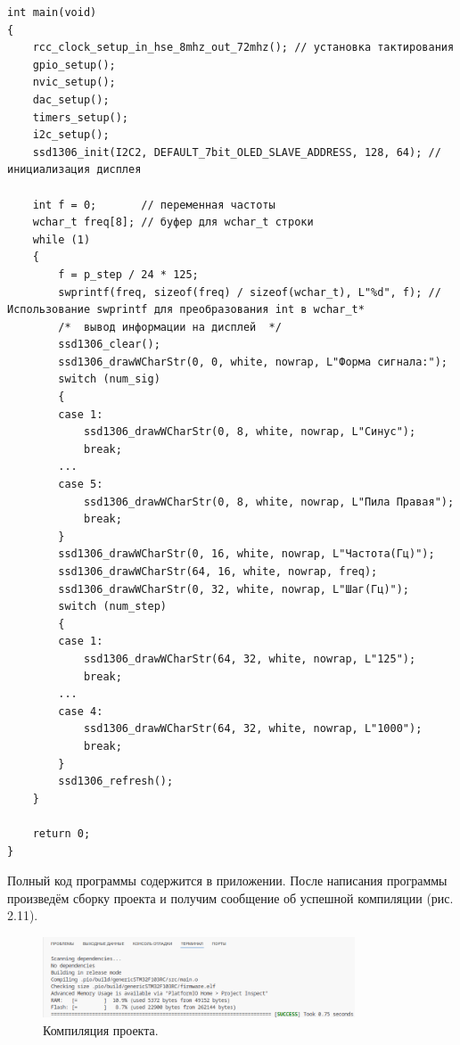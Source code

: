 \begin{code}
\begin{verbatim}
int main(void)
{
    rcc_clock_setup_in_hse_8mhz_out_72mhz(); // установка тактирования
    gpio_setup();
    nvic_setup();
    dac_setup();
    timers_setup();
    i2c_setup();
    ssd1306_init(I2C2, DEFAULT_7bit_OLED_SLAVE_ADDRESS, 128, 64); // инициализация дисплея

    int f = 0;       // переменная частоты
    wchar_t freq[8]; // буфер для wchar_t строки
    while (1)
    {
        f = p_step / 24 * 125;
        swprintf(freq, sizeof(freq) / sizeof(wchar_t), L"%d", f); // Использование swprintf для преобразования int в wchar_t*
        /*  вывод информации на дисплей  */
        ssd1306_clear();
        ssd1306_drawWCharStr(0, 0, white, nowrap, L"Форма сигнала:");
        switch (num_sig)
        {
        case 1:
            ssd1306_drawWCharStr(0, 8, white, nowrap, L"Синус");
            break;
        ...
        case 5:
            ssd1306_drawWCharStr(0, 8, white, nowrap, L"Пила Правая");
            break;
        }
        ssd1306_drawWCharStr(0, 16, white, nowrap, L"Частота(Гц)");
        ssd1306_drawWCharStr(64, 16, white, nowrap, freq);
        ssd1306_drawWCharStr(0, 32, white, nowrap, L"Шаг(Гц)");
        switch (num_step)
        {
        case 1:
            ssd1306_drawWCharStr(64, 32, white, nowrap, L"125");
            break;
        ...
        case 4:
            ssd1306_drawWCharStr(64, 32, white, nowrap, L"1000");
            break;
        }
        ssd1306_refresh();
    }

    return 0;
}
\end{verbatim}
\end{code}
	
	Полный код программы содержится в приложении. После написания программы произведём сборку проекта и получим сообщение об успешной компиляции (рис. 2.11).
	
	\begin{figure}[H]
    \centering
    \includegraphics[width=0.825\textwidth]{../image/compile.png}
    \caption{Компиляция проекта.}
	\end{figure}
	
